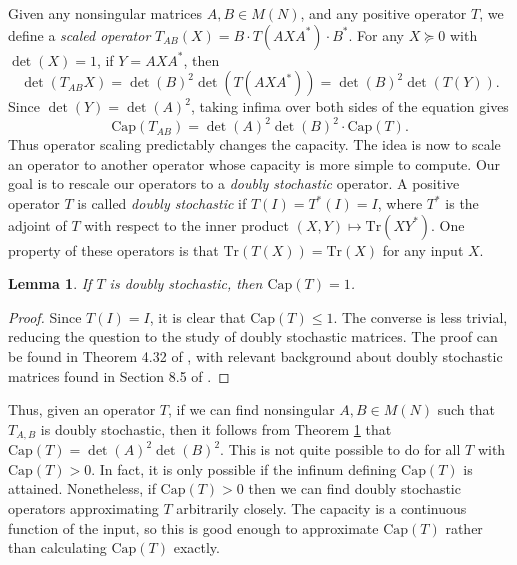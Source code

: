 \documentclass[12pt]{article}
\newtheorem{lemma}[theorem]{Lemma}
\begin{document}
Given any nonsingular matrices $A,B \in M(N)$, and any positive operator $T$, we define a \emph{scaled operator} $T_{AB}(X) = B \cdot T(AXA^*) \cdot B^*$. For any $X \succeq 0$ with $\det(X) = 1$, if $Y = AXA^*$, then
%
\[ \det(T_{AB}X) = \det(B)^2 \det(T(AXA^*)) = \det(B)^2 \det(T(Y)). \]
%
Since $\det(Y) = \det(A)^2$, taking infima over both sides of the equation gives
%
\[ \text{Cap}(T_{AB}) = \det(A)^2 \det(B)^2 \cdot \text{Cap}(T). \]
%
Thus operator scaling predictably changes the capacity. The idea is now to scale an operator to another operator whose capacity is more simple to compute. Our goal is to rescale our operators to a \emph{doubly stochastic} operator. A positive operator $T$ is called \emph{doubly stochastic} if $T(I) = T^*(I) = I$, where $T^*$ is the adjoint of $T$ with respect to the inner product $(X,Y) \mapsto \text{Tr}(XY^*)$. One property of these operators is that $\text{Tr}(T(X)) = \text{Tr}(X)$ for any input $X$.

\begin{lemma} \label{doublystochasticcapacitytheorem}
    If $T$ is doubly stochastic, then $\text{Cap}(T) = 1$.
\end{lemma}
\begin{proof}
    Since $T(I) = I$, it is clear that $\text{Cap}(T) \leq 1$. The converse is less trivial, reducing the question to the study of doubly stochastic matrices. The proof can be found in Theorem 4.32 of \cite{watrous}, with relevant background about doubly stochastic matrices found in Section 8.5 of \cite{serre}.
\end{proof}

Thus, given an operator $T$, if we can find nonsingular $A,B \in M(N)$ such that $T_{A,B}$ is doubly stochastic, then it follows from Theorem \ref{doublystochasticcapacitytheorem} that $\text{Cap}(T) = \det(A)^2 \det(B)^2$. This is not quite possible to do for all $T$ with $\text{Cap}(T) > 0$. In fact, it is only possible if the infinum defining $\text{Cap}(T)$ is attained. Nonetheless, if $\text{Cap}(T) > 0$ then we can find doubly stochastic operators approximating $T$ arbitrarily closely. The capacity is a continuous function of the input, so this is good enough to approximate $\text{Cap}(T)$ rather than calculating $\text{Cap}(T)$ exactly.
\end{document}
